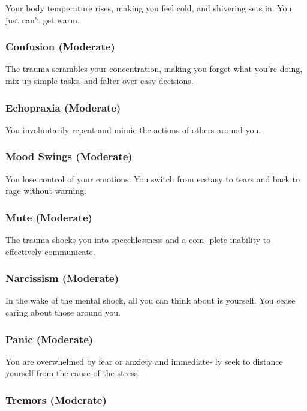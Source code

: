 Your body temperature rises, making you feel cold, 
and shivering sets in. You just can't get warm.

\subsubsection{Confusion (Moderate)}

The trauma scrambles your concentration, making 
you forget what you're doing, mix up simple tasks, 
and falter over easy decisions.

\subsubsection{Echopraxia (Moderate)}

You involuntarily repeat and mimic the actions of 
others around you.

\subsubsection{Mood Swings (Moderate)}

You lose control of your emotions. You switch from 
ecstasy to tears and back to rage without warning.

\subsubsection{Mute (Moderate)}

The trauma shocks you into speechlessness and a com-
plete inability to effectively communicate.

\subsubsection{Narcissism (Moderate)}

In the wake of the mental shock, all you can think about 
is yourself. You cease caring about those around you.

\subsubsection{Panic (Moderate)}

You are overwhelmed by fear or anxiety and immediate-
ly seek to distance yourself from the cause of the stress.

\subsubsection{Tremors (Moderate)}

